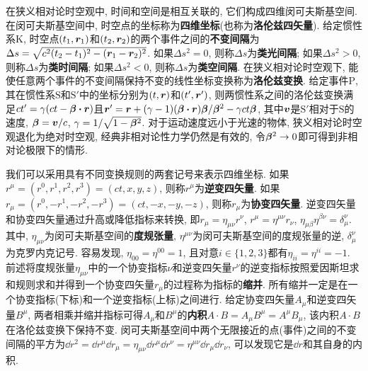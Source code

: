 在狭义相对论时空观中, 时间和空间是相互关联的, 它们构成四维闵可夫斯基空间. 在闵可夫斯基空间中, 时空点的坐标称为\textbf{四维坐标}(也称为\textbf{洛伦兹四矢量}). 给定惯性系$ \mathrm{K} $, 时空点$ (t_1,\vb*{r}_1) $和$ (t_2,\vb*{r}_2) $的两个事件之间的\textbf{不变间隔}为$ \Delta s = \sqrt{c^2(t_2-t_1)^2-(\vb*{r}_1-\vb*{r}_2)^2} $. 如果$ \Delta s^2 = 0 $, 则称$ \Delta s $为\textbf{类光间隔}; 如果$ \Delta s^2 > 0 $, 则称$ \Delta s $为\textbf{类时间隔}; 如果$ \Delta s^2 < 0 $, 则称$ \Delta s $为\textbf{类空间隔}. 在狭义相对论时空观下, 能使任意两个事件的不变间隔保持不变的线性坐标变换称为\textbf{洛伦兹变换}. 给定事件$ \mathrm{P} $, 其在惯性系$ \mathrm{S} $和$ \mathrm{S}' $中的坐标分别为$ (t,\vb*{r}) $和$ (t',\vb*{r}') $, 则两惯性系之间的洛伦兹变换满足$ ct' = \gamma(ct - \vb*{\beta} \vdot \vb*{r}) $且$ \vb*{r}' = \vb*{r} + (\gamma-1) (\vb*{\beta} \vdot \vb*{r}) \vb*{\beta} / \vb*{\beta}^2 - \gamma ct \vb*{\beta} $, 其中$ \vb*{v} $是$ \mathrm{S}' $相对于$ \mathrm{S} $的速度, $ \vb*{\beta}=\vb*{v}/c $, $ \gamma=1/\sqrt{1-\vb*{\beta}^2} $. 对于运动速度远小于光速的物体, 狭义相对论时空观退化为绝对时空观, 经典非相对论性力学仍然是有效的, 令$ \vb*{\beta}^2 \to 0 $即可得到非相对论极限下的情形.

我们可以采用具有不同变换规则的两套记号来表示四维坐标. 如果$ r^{\mu}=(r^0,r^1,r^2,r^3)=(ct,x,y,z) $, 则称$ r^{\mu} $为\textbf{逆变四矢量}. 如果$ r_{\mu}=(r^0,-r^1,-r^2,-r^3)=(ct,-x,-y,-z) $, 则称$ r_{\mu} $为\textbf{协变四矢量}. 逆变四矢量和协变四矢量通过升高或降低指标来转换, 即$ r_{\mu}=\eta_{\mu\nu} r^{\nu} $, $ r^{\mu}=\eta^{\mu\nu} r_{\nu} $, $ \eta_{\mu\beta}\eta^{\beta\nu}=\delta_{\mu}^{\nu} $. 其中, $ \eta_{\mu\nu} $为闵可夫斯基空间的\textbf{度规张量}, $ \eta^{\mu\nu} $为闵可夫斯基空间的度规张量的逆, $ \delta_{\mu}^{\nu} $为克罗内克记号. 容易发现, $ \eta_{00}=\eta^{00}=1 $, 且对意$ i \in \{1,2,3\} $都有$ \eta_{ii}=\eta^{ii}=-1 $. 前述将度规张量$ \eta_{\mu\nu} $中的一个协变指标$ \nu $和逆变四矢量$ r^{\nu} $的逆变指标按照爱因斯坦求和规则求和并得到一个协变四矢量$ r_{\mu} $的过程称为指标的\textbf{缩并}. 所有缩并一定是在一个协变指标(下标)和一个逆变指标(上标)之间进行. 给定协变四矢量$ A_{\mu} $和逆变四矢量$ B^{\mu} $, 两者相乘并缩并指标可得$ A_{\mu} $和$ B^{\mu} $的\textbf{内积}$ A \cdot B = A_{\mu}B^{\mu} = A^{\mu}B_{\mu} $, 该内积$ A \cdot B $在洛伦兹变换下保持不变. 闵可夫斯基空间中两个无限接近的点(事件)之间的不变间隔的平方为$ \dd r^2 = \dd{r^{\mu}} \dd{r_{\mu}} = \eta_{\mu\nu} \dd{r^{\mu}} \dd{r^{\nu}} = \eta^{\mu\nu} \dd{r_{\mu}} \dd{r_{\nu}} $, 可以发现它是$ \dd{r} $和其自身的内积.


